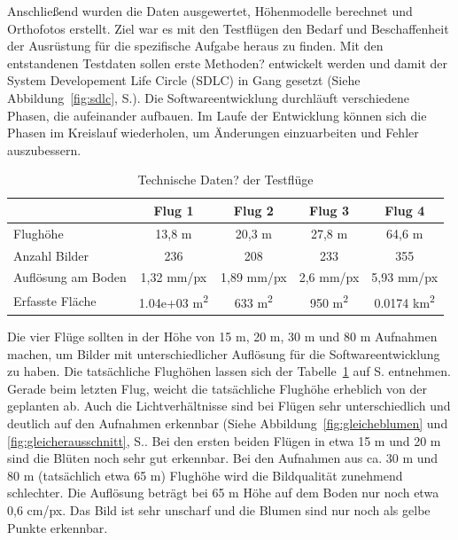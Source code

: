 Anschließend wurden die Daten ausgewertet, Höhenmodelle berechnet und Orthofotos erstellt. Ziel war es mit den Testflügen den Bedarf und Beschaffenheit der Ausrüstung für die spezifische Aufgabe heraus zu finden. Mit den entstandenen Testdaten sollen erste Methoden? entwickelt werden und damit der System Developement Life Circle (SDLC) in Gang gesetzt (Siehe Abbildung~\ref{fig:sdlc}, S.\pageref{fig:sdlc}). Die Softwareentwicklung durchläuft verschiedene Phasen, die aufeinander aufbauen. Im Laufe der Entwicklung können sich die Phasen im Kreislauf wiederholen, um Änderungen einzuarbeiten und Fehler auszubessern. 

\begin{table}[hbt]
\selectfont
\begin{tabular}{lcccc} %
\textbf{} & \textbf{Flug 1} & \textbf{Flug 2}  & \textbf{Flug 3} & \textbf{Flug 4} \\ %
\hline\hline
Flughöhe & 13,8 m & 20,3 m & 27,8 m & 64,6 m \\
Anzahl Bilder & 236 & 208 & 233 & 355 \\
Auflösung am Boden & 1,32 mm/px & 1,89 mm/px & 2,6 mm/px & 5,93 mm/px \\
Erfasste Fläche & 1.04e+03 m\textsuperscript{2} & 633 m\textsuperscript{2} & 950 m\textsuperscript{2} & 0.0174 km\textsuperscript{2} \\
\hline
\end{tabular}
\caption{Technische Daten? der Testflüge}
\label{tab:flugvergleich}
\end{table}

Die vier Flüge sollten in der Höhe von 15 m, 20 m, 30 m und 80 m Aufnahmen machen, um Bilder mit unterschiedlicher Auflösung für die Softwareentwicklung zu haben. Die tatsächliche Flughöhen lassen sich der Tabelle~\ref{tab:flugvergleich} auf S.\pageref{tab:flugvergleich} entnehmen. Gerade beim letzten Flug, weicht die tatsächliche Flughöhe erheblich von der geplanten ab. Auch die Lichtverhältnisse sind bei Flügen sehr unterschiedlich und deutlich auf den Aufnahmen erkennbar (Siehe Abbildung~\ref{fig:gleicheblumen} und \ref{fig:gleicherausschnitt}, S.\pageref{fig:gleicheblumen}. Bei den ersten beiden Flügen in etwa 15 m und 20 m sind die Blüten noch sehr gut erkennbar. Bei den Aufnahmen aus ca. 30 m und 80 m (tatsächlich etwa 65 m) Flughöhe wird die Bildqualität zunehmend schlechter. Die Auflösung beträgt bei 65 m Höhe auf dem Boden nur noch etwa 0,6 cm/px. Das Bild ist sehr unscharf und die Blumen sind nur noch als gelbe Punkte erkennbar. 

